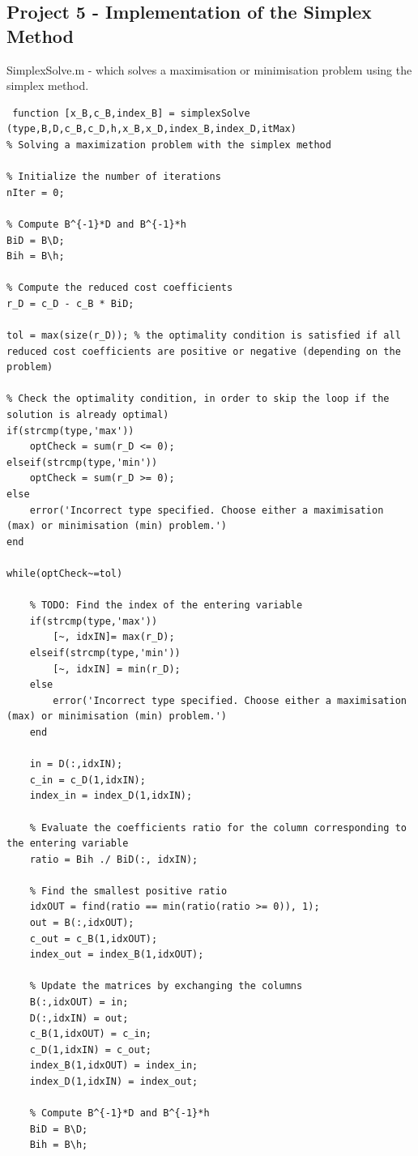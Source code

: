 \documentclass[unicode,11pt,a4paper,oneside,numbers=endperiod,openany]{scrartcl}
\begin{document}
\subsection{Project 5 - Implementation of the Simplex Method}
SimplexSolve.m - which solves a maximisation or minimisation problem using the simplex method.
\begin{lstlisting}
 function [x_B,c_B,index_B] = simplexSolve (type,B,D,c_B,c_D,h,x_B,x_D,index_B,index_D,itMax)
% Solving a maximization problem with the simplex method

% Initialize the number of iterations
nIter = 0;

% Compute B^{-1}*D and B^{-1}*h
BiD = B\D;
Bih = B\h;

% Compute the reduced cost coefficients
r_D = c_D - c_B * BiD;

tol = max(size(r_D)); % the optimality condition is satisfied if all reduced cost coefficients are positive or negative (depending on the problem)

% Check the optimality condition, in order to skip the loop if the solution is already optimal)
if(strcmp(type,'max'))
    optCheck = sum(r_D <= 0);
elseif(strcmp(type,'min'))
    optCheck = sum(r_D >= 0);
else
    error('Incorrect type specified. Choose either a maximisation (max) or minimisation (min) problem.')
end

while(optCheck~=tol)

    % TODO: Find the index of the entering variable
    if(strcmp(type,'max'))
        [~, idxIN]= max(r_D);
    elseif(strcmp(type,'min'))
        [~, idxIN] = min(r_D);
    else
        error('Incorrect type specified. Choose either a maximisation (max) or minimisation (min) problem.')
    end

    in = D(:,idxIN);
    c_in = c_D(1,idxIN);
    index_in = index_D(1,idxIN);

    % Evaluate the coefficients ratio for the column corresponding to the entering variable
    ratio = Bih ./ BiD(:, idxIN);

    % Find the smallest positive ratio
    idxOUT = find(ratio == min(ratio(ratio >= 0)), 1);
    out = B(:,idxOUT);
    c_out = c_B(1,idxOUT);
    index_out = index_B(1,idxOUT);

    % Update the matrices by exchanging the columns
    B(:,idxOUT) = in;
    D(:,idxIN) = out;
    c_B(1,idxOUT) = c_in;
    c_D(1,idxIN) = c_out;
    index_B(1,idxOUT) = index_in;
    index_D(1,idxIN) = index_out;

    % Compute B^{-1}*D and B^{-1}*h
    BiD = B\D;
    Bih = B\h;


\end{lstlisting}
\end{document}
